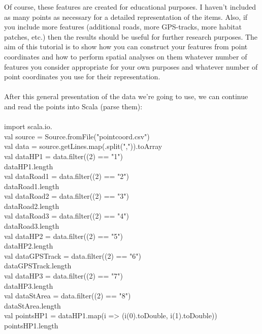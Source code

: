 \documentclass {article}
\begin{document}
Of course, these features are created for educational purposes. I haven't included as many points as necessary for a detailed representation of the items. Also, if you include more features (additional roads, more GPS-tracks, more habitat patches, etc.) then the results should be useful for further research purposes. The aim of this tutorial is to show how you can construct your features from point coordinates and how to perform spatial analyses on them whatever number of features you consider appropriate for your own purposes and whatever number of point coordinates you use for their representation.      
\\
\\
After this general presentation of the data we're going to use, we can continue and read the points into Scala \cite{epfl_scala_2017} (parse them):
\\
\\
import scala.io.\underline{\space} \\
val source = Source.fromFile("pointcoord.csv")\\
val data = source.getLines.map(\underline{\space}.split(",")).toArray\\
val dataHP1 = data.filter(\underline{\space}(2) == "1")\\
dataHP1.length\\
val dataRoad1 = data.filter(\underline{\space}(2) == "2")\\
dataRoad1.length\\
val dataRoad2 = data.filter(\underline{\space}(2) == "3")\\
dataRoad2.length\\
val dataRoad3 = data.filter(\underline{\space}(2) == "4")\\
dataRoad3.length\\
val dataHP2 = data.filter(\underline{\space}(2) == "5")\\
dataHP2.length\\
val dataGPSTrack = data.filter(\underline{\space}(2) == "6")\\
dataGPSTrack.length\\
val dataHP3 = data.filter(\underline{\space}(2) == "7")\\
dataHP3.length\\
val dataStArea =  data.filter(\underline{\space}(2) == "8")\\
dataStArea.length\\
val pointsHP1 = dataHP1.map(i => (i(0).toDouble, i(1).toDouble))\\
pointsHP1.length\\
\end{document}
